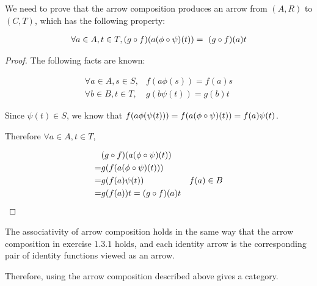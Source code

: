 \documentclass[11pt]{article}
\begin{document}
We need to prove that the arrow composition produces an arrow from $(A,R)$ to $(C,T)$,
which has the following property:

\begin{align*}
  \forall a \in A, t \in T, (g \circ f)(a (\phi \circ \psi)(t)) = \
  (g \circ f)(a)t
\end{align*}

\begin{proof}
  The following facts are known:

  \begin{align*}
    \forall a \in A, s \in S, & f(a\phi(s)) = f(a)s \\
    \forall b \in B, t \in T, & g(b\psi(t)) = g(b)t
  \end{align*}

  Since $\psi(t) \in S$, we know that
  $ f(a \phi(\psi(t))) = f(a (\phi \circ \psi)(t)) = f(a) \psi(t) $.

  Therefore $\forall a \in A, t \in T$,

  \begin{align*}
    & (g \circ f)(a (\phi \circ \psi)(t)) \\
    = & g(f(a (\phi \circ \psi)(t)) ) \\
    = & g(f(a) \psi(t) ) & f(a) \in B \\
    = & g(f(a))t = (g \circ f)(a)t
  \end{align*}

\end{proof}

The associativity of arrow composition holds in the same way that
the arrow composition in exercise $1.3.1$ holds, and each identity arrow
is the corresponding pair of identity functions viewed as an arrow.

Therefore, using the arrow composition described above
gives a category.


\subsubsection{}
\end{document}
